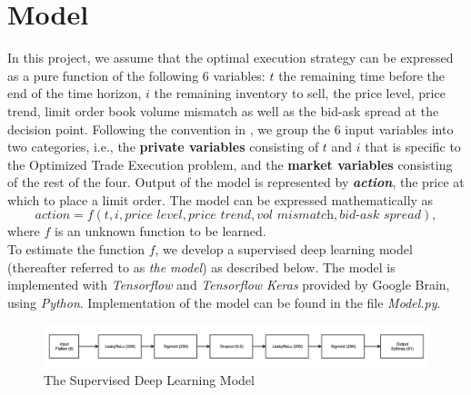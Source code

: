 \documentclass[12pt]{extarticle}
\begin{document}
\section{Model}
In this project, we assume that the optimal execution strategy can be expressed as
a pure function of the following 6 variables: $t$ the remaining time before the end of
the time horizon, $i$ the remaining inventory to sell, the price level, price trend,
limit order book volume mismatch as well as the bid-ask spread at the decision point.
Following the convention in \cite{reinforcement}, we group the 6 input variables
into two categories, i.e., the \textbf{private variables} consisting of $t$ and $i$
that is specific to the Optimized Trade Execution problem, and the \textbf{market variables}
consisting of the rest of the four. Output of the model is represented by \textit{\textbf{action}},
the price at which to place a limit order.
The model can be expressed mathematically as
$$ \textit{action} = f(t, i, \textit{price level}, \textit{price trend}, \textit{vol mismatch}, \textit{bid-ask spread}), $$
where $f$ is an unknown function to be learned. \\


\noindent To estimate the function $f$, we develop a supervised deep learning model (thereafter referred to as \textit{the model}) as described below.
The model is implemented with \textit{Tensorflow} and \textit{Tensorflow
Keras} provided by Google Brain, using \textit{Python}.
Implementation of the model can be found in the file \textit{Model.py}.\\


\begin{figure}[h]
\centering
\includegraphics[width=\textwidth]{model}
\caption{The Supervised Deep Learning Model}
\end{figure}
\end{document}
